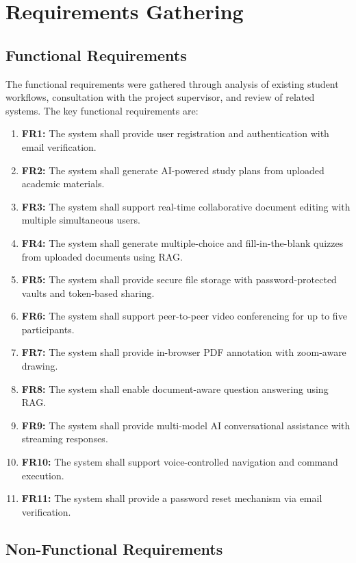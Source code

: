\documentclass[12pt,a4paper]{report}
\begin{document}
\section{Requirements Gathering}

\subsection{Functional Requirements}

The functional requirements were gathered through analysis of existing student workflows, consultation with the project supervisor, and review of related systems. The key functional requirements are:

\begin{enumerate}
    \item \textbf{FR1:} The system shall provide user registration and authentication with email verification.
    \item \textbf{FR2:} The system shall generate AI-powered study plans from uploaded academic materials.
    \item \textbf{FR3:} The system shall support real-time collaborative document editing with multiple simultaneous users.
    \item \textbf{FR4:} The system shall generate multiple-choice and fill-in-the-blank quizzes from uploaded documents using RAG.
    \item \textbf{FR5:} The system shall provide secure file storage with password-protected vaults and token-based sharing.
    \item \textbf{FR6:} The system shall support peer-to-peer video conferencing for up to five participants.
    \item \textbf{FR7:} The system shall provide in-browser PDF annotation with zoom-aware drawing.
    \item \textbf{FR8:} The system shall enable document-aware question answering using RAG.
    \item \textbf{FR9:} The system shall provide multi-model AI conversational assistance with streaming responses.
    \item \textbf{FR10:} The system shall support voice-controlled navigation and command execution.
    \item \textbf{FR11:} The system shall provide a password reset mechanism via email verification.
\end{enumerate}

\subsection{Non-Functional Requirements}
\end{document}
